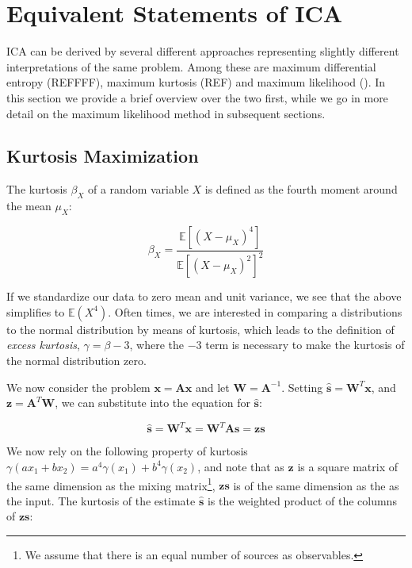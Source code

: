 \documentclass[11pt, oneside, a4paper]{report}
\begin{document}
\section{Equivalent Statements of ICA}\label{equiv_ica}

ICA can be derived by several different approaches representing slightly
different interpretations of the same problem. Among these are maximum 
differential entropy (REFFFF), maximum kurtosis (REF) and 
maximum likelihood (\cite{Pham}). 
In this section we provide a brief overview over the two first, while we
go in more detail on the maximum likelihood method in subsequent sections.

\subsection{Kurtosis Maximization}

The kurtosis $\beta_X$ of a random variable $X$ is defined as the fourth
moment around the mean $\mu_X$:


\begin{equation}
  \beta_X = \frac{\mathbb{E}[(X-\mu_X)^4]}{\mathbb{E}[(X-\mu_X)^2]^2} 
\end{equation}

If we standardize our data to zero mean and unit variance, we see that
the above simplifies to $\mathbb{E}(X^4)$. Often times, we are
interested in comparing a distributions to the normal distribution by
means of kurtosis, which leads to the definition of \emph{excess
  kurtosis}, $\gamma = \beta - 3$, where the $-3$ term is necessary to
make the kurtosis of the normal distribution zero. 

We now consider the problem $\boldsymbol{x}=\boldsymbol{A}\boldsymbol{x}$ 
and let $\boldsymbol{W} = \boldsymbol{A}^{-1}$. Setting 
$\hat{\boldsymbol{s}} = \boldsymbol{W}^T\boldsymbol{x}$, and
$\boldsymbol{z} = \boldsymbol{A}^T\boldsymbol{W}$, we can substitute into
the equation for $\hat{\boldsymbol{s}}$:


\begin{equation}
  \hat{\boldsymbol{s}} = \boldsymbol{W}^T\boldsymbol{x} = \boldsymbol{W}^T\boldsymbol{A}\boldsymbol{s}
  =\boldsymbol{z}\boldsymbol{s}
\end{equation}

We now rely on the following property of kurtosis 
$\gamma(ax_1+bx_2) = a^4\gamma(x_1) + b^4\gamma(x_2)$, and note that as 
$\boldsymbol{z}$ is a square matrix of the same dimension as the mixing 
matrix\footnote{We assume that there is an equal number of sources as observables.},
$\boldsymbol{z}\boldsymbol{s}$ is of the same dimension as the as the input. 
The kurtosis of the estimate $\hat{\boldsymbol{s}}$ is the weighted product
of the columns of $\boldsymbol{z}\boldsymbol{s}$:
\end{document}
